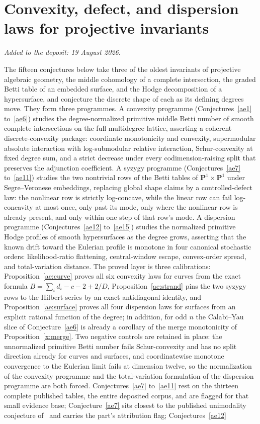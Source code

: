 \documentclass[11pt]{article}
\theoremstyle{definition}
\begin{document}
\part{Convexity, defect, and dispersion laws for projective invariants}

\medskip\noindent\emph{Added to the deposit: 19 August 2026.}\par\medskip

The fifteen conjectures below take three of the oldest invariants of projective algebraic geometry, the middle cohomology of a complete intersection, the graded Betti table of an embedded surface, and the Hodge decomposition of a hypersurface, and conjecture the discrete shape of each as its defining degrees move.  They form three programmes.  A convexity programme (Conjectures~\ref{ae1} to~\ref{ae6}) studies the degree-normalized primitive middle Betti number of smooth complete intersections on the full multidegree lattice, asserting a coherent discrete-convexity package: coordinate monotonicity and convexity, supermodular absolute interaction with log-submodular relative interaction, Schur-convexity at fixed degree sum, and a strict decrease under every codimension-raising split that preserves the adjunction coefficient.  A syzygy programme (Conjectures~\ref{ae7} to~\ref{ae11}) studies the two nontrivial rows of the Betti tables of $\mathbf P^1\times\mathbf P^1$ under Segre--Veronese embeddings, replacing global shape claims by a controlled-defect law: the nonlinear row is strictly log-concave, while the linear row can fail log-concavity at most once, only past its mode, only where the nonlinear row is already present, and only within one step of that row's mode.  A dispersion programme (Conjectures~\ref{ae12} to~\ref{ae15}) studies the normalized primitive Hodge profiles of smooth hypersurfaces as the degree grows, asserting that the known drift toward the Eulerian profile is monotone in four canonical stochastic orders: likelihood-ratio flattening, central-window escape, convex-order spread, and total-variation distance.  The proved layer is three calibrations: Proposition~\ref{ae:curve} proves all six convexity laws for curves from the exact formula $B=\sum_id_i-c-2+2/D$, Proposition~\ref{ae:strand} pins the two syzygy rows to the Hilbert series by an exact antidiagonal identity, and Proposition~\ref{ae:surface} proves all four dispersion laws for surfaces from an explicit rational function of the degree; in addition, for odd $n$ the Calabi--Yau slice of Conjecture~\ref{ae6} is already a corollary of the merge monotonicity of Proposition~\ref{x:merge}.  Two negative controls are retained in place: the unnormalized primitive Betti number fails Schur-convexity and has no split direction already for curves and surfaces, and coordinatewise monotone convergence to the Eulerian limit fails at dimension twelve, so the normalization of the convexity programme and the total-variation formulation of the dispersion programme are both forced.  Conjectures~\ref{ae7} to~\ref{ae11} rest on the thirteen complete published tables, the entire deposited corpus, and are flagged for that small evidence base; Conjecture~\ref{ae7} sits closest to the published unimodality conjecture of~\cite{BCEGLY22} and carries the part's attribution flag; Conjectures~\ref{ae12} 
\end{document}
